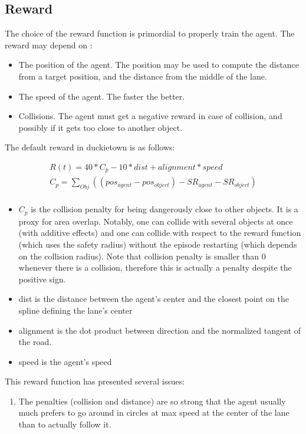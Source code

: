 \documentclass[12pt]{article}
\begin{document}
\subsection{Reward}
The choice of the reward function is primordial to properly train the agent. The reward may depend on :

\begin{itemize}
    \item The position of the agent. The position may be used to compute the distance from a target position, and the distance from the middle of the lane.
    \item The speed of the agent. The faster the better.
    \item Collisions. The agent must get a negative reward in case of collision, and possibly if it gets too  close to another object.
\end{itemize}

The default reward in duckietown is as follows:

\begin{align}
R(t) = 40 * C_{p} - 10*dist + alignment*speed \\
C_p = \sum_{Obj} ((pos_{agent} - pos_{object}) - SR_{agent} - SR_{object}) \\
\end{align}
\begin{itemize}
    \item $C_p$ is the collision penalty for being dangerously close to other objects. It is a proxy for area overlap. Notably, one can collide with several objects at once (with additive effects) and one can collide with respect to the reward function (which uses the safety radius) without the episode restarting (which depends on the collision radius). Note that collision penalty is smaller than 0 whenever there is a collision, therefore this is actually a penalty despite the positive sign.
    \item dist is the distance between the agent's center and the closest point on the spline defining the lane's center
    \item alignment is the dot product between direction and the normalized tangent of the road.
    \item speed is the agent's speed
\end{itemize}

This reward function has presented several issues:

\begin{enumerate}
    \item The penalties (collision and distance) are so strong that the agent usually much prefers to go around in circles at max speed at the center of the lane than to actually follow it.
\end{enumerate}
\end{document}
